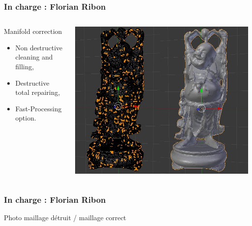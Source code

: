 \documentclass{beamer}
\begin{document}
\begin{frame}
	\frametitle{In charge : Florian Ribon}

    \begin{columns}[t]
  	\begin{column}{5cm}
        \begin{block}{Manifold correction}
		    \begin{itemize}
			    \item Non destructive cleaning and filling,
			    \item Destructive total repairing,
			    \item Fast-Processing option.
		    \end{itemize}
        \end{block}
    \end{column}

    \begin{column}{6cm}
        \begin{center}
		    \includegraphics[height=.7\textheight]{repair}
	    \end{center}
    \end{column}

    \end{columns}
\end{frame}

\begin{frame}
	\frametitle{In charge : Florian Ribon}
    
  Photo maillage détruit / maillage correct

\end{frame}
\end{document}
